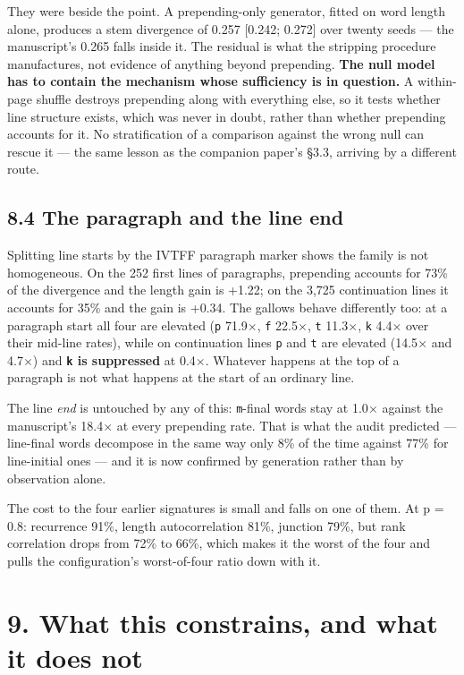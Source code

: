 \documentclass[11pt,a4paper]{article}
\begin{document}
They were beside the point. A prepending-only generator, fitted on word length alone, produces a stem divergence of 0.257 [0.242; 0.272] over twenty seeds --- the manuscript's 0.265 falls inside it. The residual is what the stripping procedure manufactures, not evidence of anything beyond prepending. \textbf{The null model has to contain the mechanism whose sufficiency is in question.} A within-page shuffle destroys prepending along with everything else, so it tests whether line structure exists, which was never in doubt, rather than whether prepending accounts for it. No stratification of a comparison against the wrong null can rescue it --- the same lesson as the companion paper's \S3.3, arriving by a different route.


\subsection*{8.4 The paragraph and the line end}


Splitting line starts by the IVTFF paragraph marker shows the family is not homogeneous. On the 252 first lines of paragraphs, prepending accounts for 73\% of the divergence and the length gain is +1.22; on the 3,725 continuation lines it accounts for 35\% and the gain is +0.34. The gallows behave differently too: at a paragraph start all four are elevated (\texttt{p} 71.9$\times$, \texttt{f} 22.5$\times$, \texttt{t} 11.3$\times$, \texttt{k} 4.4$\times$ over their mid-line rates), while on continuation lines \texttt{p} and \texttt{t} are elevated (14.5$\times$ and 4.7$\times$) and \textbf{\texttt{k} is suppressed} at 0.4$\times$. Whatever happens at the top of a paragraph is not what happens at the start of an ordinary line.


The line \emph{end} is untouched by any of this: \texttt{m}-final words stay at 1.0$\times$ against the manuscript's 18.4$\times$ at every prepending rate. That is what the audit predicted --- line-final words decompose in the same way only 8\% of the time against 77\% for line-initial ones --- and it is now confirmed by generation rather than by observation alone.


The cost to the four earlier signatures is small and falls on one of them. At p = 0.8: recurrence 91\%, length autocorrelation 81\%, junction 79\%, but rank correlation drops from 72\% to 66\%, which makes it the worst of the four and pulls the configuration's worst-of-four ratio down with it.


\section*{9. What this constrains, and what it does not}
\end{document}
